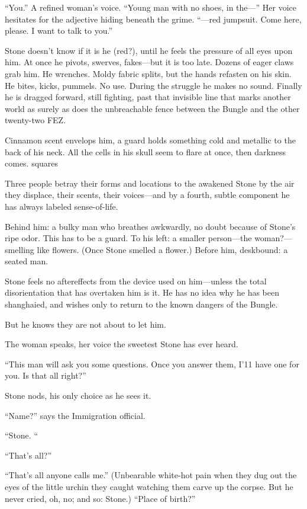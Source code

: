 “You.” A refined woman’s voice. “Young man with no shoes, in the—” Her voice hesitates for the adjective hiding beneath the grime. “—red jumpsuit. Come here, please. I want to talk to you.”

Stone doesn’t know if it is he (red?), until he feels the pressure of all eyes upon him. At once he pivots, swerves, fakes—but it is too late. Dozens of eager claws grab him. He wrenches. Moldy fabric splits, but the hands refasten on his skin. He bites, kicks, pummels. No use. During the struggle he makes no sound. Finally he is dragged forward, still fighting, past that invisible line that marks another world as surely as does the unbreachable fence between the Bungle and the other twenty-two FEZ.

Cinnamon scent envelops him, a guard holds something cold and metallic to the back of his neck. All the cells in his skull seem to flare at once, then darkness comes.
squares

Three people betray their forms and locations to the awakened Stone by the air they displace, their scents, their voices—and by a fourth, subtle component he has always labeled sense-of-life.

Behind him: a bulky man who breathes awkwardly, no doubt because of Stone’s ripe odor. This has to be a guard. To his left: a smaller person—the woman?—smelling like flowers. (Once Stone smelled a flower.) Before him, deskbound: a seated man.

Stone feels no aftereffects from the device used on him—unless the total disorientation that has overtaken him is it. He has no idea why he has been shanghaied, and wishes only to return to the known dangers of the Bungle.

But he knows they are not about to let him.

The woman speaks, her voice the sweetest Stone has ever heard.

“This man will ask you some questions. Once you answer them, I’11 have one for you. Is that all right?”

Stone nods, his only choice as he sees it.

“Name?” says the Immigration official.

“Stone. “

“That’s all?”

“That’s all anyone calls me.” (Unbearable white-hot pain when they dug out the eyes of the little urchin they caught watching them carve up the corpse. But he never cried, oh, no; and so: Stone.) “Place of birth?”

